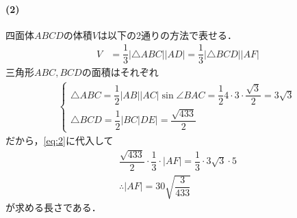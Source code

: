 \documentclass[../../main.tex]{subfiles}
\begin{document}
\paragraph{(2)}
四面体$ABCD$の体積$V$は以下の2通りの方法で表せる．
\begin{align}
  V &= \dfrac{1}{3}|\triangle ABC||AD| = \dfrac{1}{3}|\triangle BCD||AF| \label{eq:2}
\end{align}
三角形$ABC, BCD$の面積はそれぞれ
\begin{align}
  \begin{cases}
    \triangle ABC = \dfrac{1}{2}|AB||AC|\sin\angle BAC = \dfrac{1}{2} 4\cdot 3\cdot \dfrac{\sqrt{3}}{2} = 3\sqrt{3} \\
    \triangle BCD = \dfrac{1}{2}|BC|DE| = \dfrac{\sqrt{433}}{2}
  \end{cases}
\end{align}
だから，\cref{eq:2}に代入して
\begin{align}
  \dfrac{\sqrt{433}}{2} \cdot \dfrac{1}{3} \cdot |AF| = \dfrac{1}{3} \cdot 3\sqrt{3} \cdot 5 \\
  \therefore
  |AF| = 30 \sqrt{\dfrac{3}{433}}
\end{align}
が求める長さである．
\end{document}

